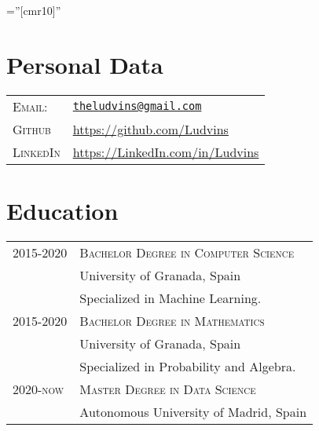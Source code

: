 \documentclass[a4paper,10pt]{article} %
\begin{document}
\pagestyle{empty} %

\font\fb=''[cmr10]'' %


\par{ %

\section{Personal Data}

\raggedright
\begin{tabular}{ll}
\textsc{Email:} & \href{mailto:theludvins@gmail.com}{\texttt{theludvins@gmail.com}}\\
\textsc{Github} & \url{https://github.com/Ludvins}\\
\textsc{LinkedIn} & \url{https://LinkedIn.com/in/Ludvins}
\end{tabular}


\section{Education}

\begin{tabular}{lp{11cm}}
    \textsc{2015-2020}
  & \textsc{Bachelor Degree in Computer Science}\\
  & \footnotesize University of Granada, Spain\\
  & \footnotesize Specialized in Machine Learning.\\
 
  \textsc{2015-2020}
  & \textsc{Bachelor Degree in Mathematics}\\
  & \footnotesize University of Granada, Spain\\
  & \footnotesize Specialized in Probability and Algebra. \\

  \textsc{2020-now}
  & \textsc{Master Degree in Data Science}\\
  & \footnotesize Autonomous University of Madrid, Spain\\
\end{tabular}


}
\end{document}
